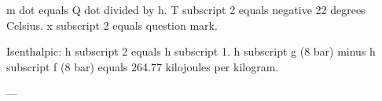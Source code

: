 m dot equals Q dot divided by h.  
T subscript 2 equals negative 22 degrees Celsius.  
x subscript 2 equals question mark.  

Isenthalpic: h subscript 2 equals h subscript 1.  
h subscript g (8 bar) minus h subscript f (8 bar) equals 264.77 kilojoules per kilogram.  

---